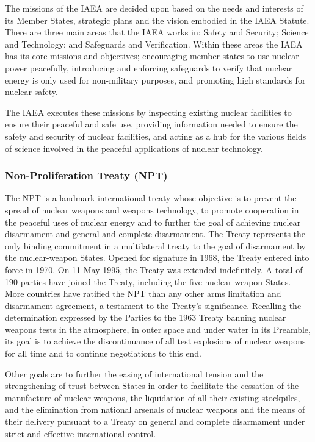 \documentclass[twoside,titlepage,11pt,twocolumn,a4paper]{article}
\begin{document}
The missions of the IAEA are decided upon based on the needs and interests of its
Member States, strategic plans and the vision embodied in the IAEA
Statute. There are three main areas that the IAEA works in: Safety and
Security; Science and Technology; and Safeguards and
Verification. Within these areas the IAEA has its core missions and
objectives; encouraging member states to use nuclear power peacefully,
introducing and enforcing safeguards to verify that nuclear energy is
only used for non-military purposes, and promoting high standards for
nuclear safety.  

The IAEA executes these missions by inspecting
existing nuclear facilities to ensure their peaceful and safe use,
providing information needed to ensure the safety and security of
nuclear facilities, and acting as a hub for the various fields of
science involved in the peaceful applications of nuclear technology.

\subsubsection{Non-Proliferation Treaty (NPT)}
The NPT is a landmark international treaty whose objective is to 
prevent the spread of nuclear weapons and weapons technology, to 
promote cooperation in the peaceful uses of nuclear energy and to 
further the goal of achieving nuclear disarmament and general and 
complete disarmament. The Treaty represents the only binding 
commitment in a multilateral treaty to the goal of disarmament 
by the nuclear-weapon States. Opened for signature in 1968, the 
Treaty entered into force in 1970. On 11 May 1995, the Treaty was
extended indefinitely. A total of 190 parties have joined the Treaty, 
including the five nuclear-weapon States. More countries have ratified 
the NPT than any other arms limitation and disarmament agreement, a 
testament to the Treaty's significance. Recalling the determination 
expressed by the Parties to the 1963 Treaty banning nuclear weapons 
tests in the atmosphere, in outer space and under water in its 
Preamble, its goal is to achieve the discontinuance of all test 
explosions of nuclear weapons for all time and to continue negotiations
to this end.

Other goals are to further the easing of international tension and the 
strengthening of trust between States in order to facilitate the cessation
of the manufacture of nuclear weapons, the liquidation of all their 
existing stockpiles, and the elimination from national arsenals of nuclear
weapons and the means of their delivery pursuant to a Treaty on general 
and complete disarmament under strict and effective international control. \citep{statement2005}
\end{document}
